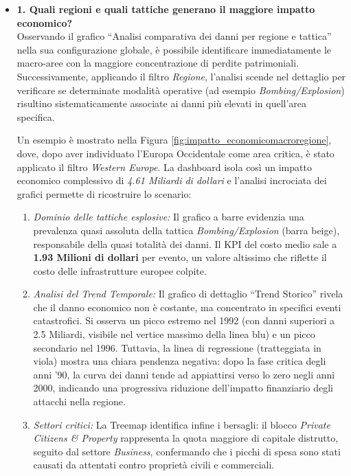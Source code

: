 \begin{itemize}

\item \textbf{1. Quali regioni e quali tattiche generano il maggiore impatto economico?} \\
Osservando il grafico “Analisi comparativa dei danni per regione e tattica” nella sua configurazione globale, è possibile identificare immediatamente le macro-aree con la maggiore concentrazione di perdite patrimoniali. 
Successivamente, {applicando il filtro \textit{Regione}}, l'analisi scende nel dettaglio per verificare se determinate modalità operative (ad esempio \textit{Bombing/Explosion}) risultino sistematicamente associate ai danni più elevati in quell'area specifica.

Un esempio è mostrato nella Figura \ref{fig:impatto_economicomacroregione}, dove, dopo aver individuato l'Europa Occidentale come area critica, è stato applicato il filtro \textit{Western Europe}. La dashboard isola così un impatto economico complessivo di \textit{4.61 Miliardi di dollari} e l'analisi incrociata dei grafici permette di ricostruire lo scenario:

\begin{enumerate}
    \item \textit{Dominio delle tattiche esplosive:} Il grafico a barre evidenzia una prevalenza quasi assoluta della tattica \textit{Bombing/Explosion} (barra beige), responsabile della quasi totalità dei danni. Il KPI del costo medio sale a \textbf{1.93 Milioni di dollari} per evento, un valore altissimo che riflette il costo delle infrastrutture europee colpite.
    
    \item \textit{Analisi del Trend Temporale:}
    Il grafico di dettaglio “Trend Storico” rivela che il danno economico non è costante, ma concentrato in specifici eventi catastrofici. Si osserva un picco estremo nel 1992 (con danni superiori a 2.5 Miliardi, visibile nel vertice massimo della linea blu) e un picco secondario nel 1996.
    Tuttavia, la linea di regressione (tratteggiata in viola) mostra una chiara pendenza negativa: dopo la fase critica degli anni '90, la curva dei danni tende ad appiattirsi verso lo zero negli anni 2000, indicando una progressiva riduzione dell'impatto finanziario degli attacchi nella regione.
    
    \item \textit{Settori critici:} La Treemap identifica infine i bersagli: il blocco \textit{Private Citizens \& Property} rappresenta la quota maggiore di capitale distrutto, seguito dal settore \textit{Business}, confermando che i picchi di spesa sono stati causati da attentati contro proprietà civili e commerciali.
\end{enumerate}


\end{itemize}
